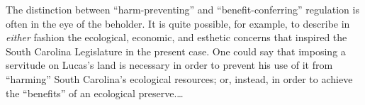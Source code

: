 %
The distinction between
``harm-preventing'' and ``benefit-conferring'' regulation is often in the eye of
the beholder. It is quite possible, for example, to describe in \textit{either}
fashion the ecological, economic, and esthetic concerns that inspired the South
Carolina Legislature in the present case. One could say that imposing a
servitude on Lucas's land is necessary in order to prevent his use of it from
``harming'' South Carolina's ecological resources; or, instead, in order to
achieve the ``benefits'' of an ecological preserve.\ldots
\unskip{}

